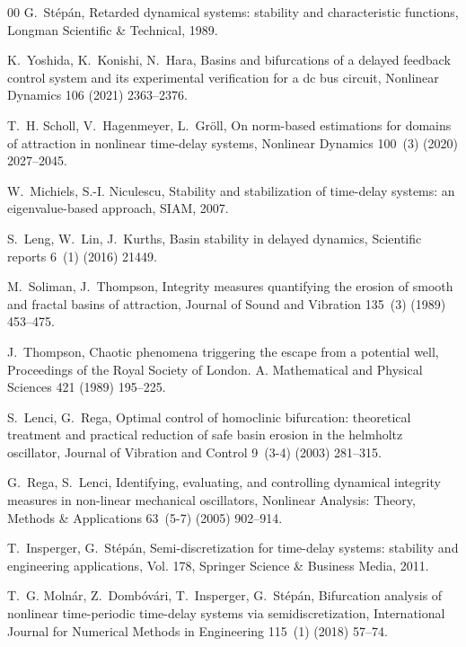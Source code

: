 \documentclass[preprint,12pt]{elsarticle}
\begin{document}
\begin{thebibliography}{00}
		G.~St{\'e}p{\'a}n, Retarded dynamical systems: stability and characteristic
		functions, Longman Scientific \& Technical, 1989.
		
		K.~Yoshida, K.~Konishi, N.~Hara, Basins and bifurcations of a delayed feedback
		control system and its experimental verification for a dc bus circuit,
		Nonlinear Dynamics 106 (2021) 2363--2376.
		
		T.~H. Scholl, V.~Hagenmeyer, L.~Gr{\"o}ll, On norm-based estimations for
		domains of attraction in nonlinear time-delay systems, Nonlinear Dynamics
		100~(3) (2020) 2027--2045.
		
		W.~Michiels, S.-I. Niculescu, Stability and stabilization of time-delay
		systems: an eigenvalue-based approach, SIAM, 2007.
		
		S.~Leng, W.~Lin, J.~Kurths, Basin stability in delayed dynamics, Scientific
		reports 6~(1) (2016) 21449.
		
		M.~Soliman, J.~Thompson, Integrity measures quantifying the erosion of smooth
		and fractal basins of attraction, Journal of Sound and Vibration 135~(3)
		(1989) 453--475.
		
		J.~Thompson, Chaotic phenomena triggering the escape from a potential well,
		Proceedings of the Royal Society of London. A. Mathematical and Physical
		Sciences 421 (1989) 195--225.
		
		S.~Lenci, G.~Rega, Optimal control of homoclinic bifurcation: theoretical
		treatment and practical reduction of safe basin erosion in the helmholtz
		oscillator, Journal of Vibration and Control 9~(3-4) (2003) 281--315.
		
		G.~Rega, S.~Lenci, Identifying, evaluating, and controlling dynamical integrity
		measures in non-linear mechanical oscillators, Nonlinear Analysis: Theory,
		Methods \& Applications 63~(5-7) (2005) 902--914.
		
		T.~Insperger, G.~St{\'e}p{\'a}n, Semi-discretization for time-delay systems:
		stability and engineering applications, Vol. 178, Springer Science \&
		Business Media, 2011.
		
		T.~G. Moln{\'a}r, Z.~Domb{\'o}v{\'a}ri, T.~Insperger, G.~St{\'e}p{\'a}n,
		Bifurcation analysis of nonlinear time-periodic time-delay systems via
		semidiscretization, International Journal for Numerical Methods in
		Engineering 115~(1) (2018) 57--74.
		

\end{thebibliography}
\end{document}
